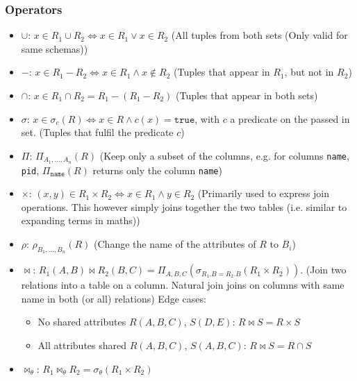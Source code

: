 \label{sec:relational-algebra}
\subsubsection{Operators}
\begin{itemize}
    \item {} $\cup$: $x \in R_1 \cup R_2 \Leftrightarrow x \in R_1 \lor x \in R_2$
          (All tuples from both sets (Only valid for same schemas))
    \item {} $-$: $x \in R_1 - R_2 \Leftrightarrow x \in R_1 \land x \notin R_2$
          (Tuples that appear in $R_1$, but not in $R_2$)
    \item {} $\cap$: $x \in R_1 \cap R_2 = R_1 - (R_1 - R_2)$
          (Tuples that appear in both sets)
    \item {} $\sigma$: $x \in \sigma_c(R) \Leftrightarrow x \in R \land c(x) = \texttt{true}$, with $c$ a predicate on the passed in set.
          (Tuples that fulfil the predicate $c$)
    \item {} $\Pi$: $\Pi_{A_1, \ldots, A_n}(R)$
          (Keep only a subset of the columns, e.g. for columns \texttt{name}, \texttt{pid}, $\Pi_{\texttt{name}}(R)$ returns only the column \texttt{name})
    \item {} $\times$: $(x, y) \in R_1 \times R_2 \Leftrightarrow x \in R_1 \land y \in R_2$
          (Primarily used to express join operations. This however simply joins together the two tables (i.e. similar to expanding terms in maths))
    \item {} $\rho$: $\rho_{B_1, \ldots, B_n}(R)$
          (Change the name of the attributes of $R$ to $B_i$)
    \item {} $\bowtie$: $R_1(A, B) \bowtie R_2(B, C) = \Pi_{A, B, C} (\sigma_{R_1.B = R_2.B}(R_1 \times R_2))$.
          (Join two relations into a table on a column. Natural join joins on columns with same name in both (or all) relations)
          Edge cases:
          \begin{itemize}
              \item No shared attributes $R(A, B, C)$, $S(D, E)$: $R \bowtie S = R \times S$
              \item All attributes shared $R(A, B, C)$, $S(A, B, C)$: $R \bowtie S = R \cap S$
          \end{itemize}
    \item {} $\bowtie_\theta$: $R_1 \bowtie_\theta R_2 = \sigma_\theta(R_1 \times R_2)$

\end{itemize}
